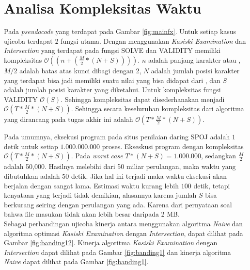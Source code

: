 \section{Analisa Kompleksitas Waktu}
Pada \textit{pseudocode} yang terdapat pada Gambar \ref{fig:mainfx}. Untuk setiap kasus ujicoba terdapat 2 fungsi utama. Dengan menggunakan \textit{Kasiski Examination} dan \textit{Intersection} yang terdapat pada fungsi SOLVE dan VALIDITY memiliki kompleksitas $\mathcal{O}((n+(\frac{M}{2}*(N+S))))$. $n$ adalah panjang karakter \plaintext atau \ciphertext , $M/2$ adalah batas atas kunci dibagi dengan 2, $N$ adalah jumlah posisi karakter yang terdapat bisa jadi memiliki suatu nilai yang bisa didapat dari \ciphertext, dan $S$ adalah jumlah posisi karakter yang diketahui. Untuk kompleksitas fungsi VALIDITY $\mathcal{O}(S)$. Sehingga kompleksitas dapat disederhanakan menjadi $\mathcal{O}(T*\frac{M}{2}*(N+S))$.
\indent Sehingga secara keseluruhan kompleksitas dari algoritma yang dirancang pada tugas akhir ini adalah $\mathcal{O}(T*\frac{M}{2}*(N+S))$.

Pada umumnya, eksekusi program pada situs penilaian daring SPOJ adalah $ 1 $ detik untuk setiap $ 1.000.000.000 $ proses. Ekseskusi program dengan kompleksitas $\mathcal{O}(T*\frac{M}{2}*(N+S))$. Pada \textit{worst case} $T*(N+S)=1.000.000$, sedangkan $\frac{M}{2}$ adalah 50,000. Hasilnya melebihi dari 50 miliar perulangan, maka waktu yang dibutuhkan adalah 50 detik. Jika hal ini terjadi maka waktu eksekusi akan berjalan dengan sangat lama. Estimasi waktu kurang lebih $100$ detik, tetapi kenyataan yang terjadi tidak demikian, alasannya karena jumlah $S$ bisa berkurang seiring dengan perulangan yang ada. Karena dari pernyataan soal bahwa file masukan tidak akan lebih besar daripada 2 MB\cite{piwakowski_crypto4_2004}.
\\
Sebagai perbandingan ujicoba kinerja antara menggunakan algoritma \textit{Naive} dan algoritma optimasi \textit{Kasiski Examination} dengan \textit{Intersection}, dapat dilihat pada Gambar \ref{fig:banding12}. Kinerja algoritma \textit{Kasiski Examination} dengan \textit{Intersection} dapat dilihat pada Gambar \ref{fig:banding1} dan kinerja algoritma \textit{Naive} dapat dilihat pada Gambar \ref{fig:banding1}.
	

